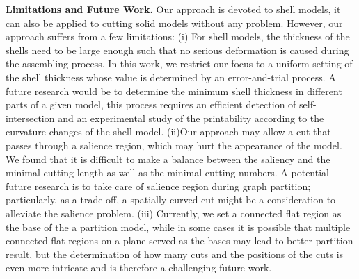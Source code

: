 \textbf{Limitations and Future Work.} Our approach is devoted to shell models, it can also be applied to cutting solid models without any problem. However, our approach suffers from a few limitations:
(i) For shell models, the thickness of the shells need to be large enough such that no serious deformation is caused during the assembling process. In this work, we restrict our focus to a uniform setting of the shell thickness whose value is determined by an error-and-trial process. A future research would be to determine the minimum shell thickness in different parts of a given model, this process requires an efficient detection of self-intersection and an experimental study of the printability according to the curvature changes of the shell model.
(ii)Our approach may allow a cut that passes through a salience region, which may hurt the appearance of the model. We found that it is difficult to make a balance between the saliency and the minimal cutting length as well as the minimal cutting numbers. A potential future research is to take care of salience region during graph partition; particularly, as a trade-off, a spatially curved cut might be a consideration to alleviate the salience problem.
(iii) Currently, we set a connected flat region as the base of the a partition model, while in some cases it is possible that multiple connected flat regions on a plane served as the bases may lead to better partition result, but the determination of how many cuts and the positions of the cuts is even more intricate and is therefore a challenging future work.
